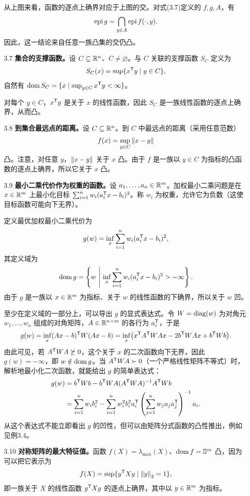 从上图来看，函数的逐点上确界对应于上图的交。对式(3.7)定义的 $f,g,A$，有
\[\operatorname{epi} g=\bigcap_{y\in A}\operatorname{epi} f(\cdot,y).\]
因此，这一结论来自任意一族凸集的交仍凸。
\begin{origexample}{3.7}
\textbf{集合的支撑函数。}设 $C\subseteq\mathbb R^n$、$C\ne\varnothing$。与 $C$ 关联的支撑函数 $S_C$ 定义为
\[S_C(x)=\sup\{x^\mathsf T y\mid y\in C\},\]
自然有 $\operatorname{dom} S_C=\{x\mid\sup_{y\in C}x^\mathsf T y<\infty\}$。

对每个 $y\in C$，$x^\mathsf T y$ 是关于 $x$ 的线性函数，因此 $S_C$ 是一族线性函数的逐点上确界，从而凸。
\end{origexample}
\begin{origexample}{3.8}
\textbf{到集合最远点的距离。}设 $C\subseteq\mathbb R^n$。到 $C$ 中最远点的距离（采用任意范数）
\[f(x)=\sup_{y\in C}\left\lVert x-y\right\rVert\]
凸。注意，对任意 $y$，$\left\lVert x-y\right\rVert$ 关于 $x$ 凸。由于 $f$ 是一族以 $y\in C$ 为指标的凸函数的逐点上确界，所以它关于 $x$ 凸。
\end{origexample}
\begin{origexample}{3.9}
\textbf{最小二乘代价作为权重的函数。}设 $a_1,\ldots,a_n\in\mathbb R^m$。加权最小二乘问题是在 $x\in\mathbb R^m$ 上最小化目标 $\sum_{i=1}^n w_i(a_i^\mathsf T x-b_i)^2$。称 $w_i$ 为权重，允许它为负数（这使目标函数可能向下无界）。

定义最优加权最小二乘代价为
\[g(w)=\inf_x\sum_{i=1}^n w_i(a_i^\mathsf T x-b_i)^2,\]
其定义域为
\[\operatorname{dom} g=\left\{w\ \middle|\ \inf_x\sum_{i=1}^n w_i(a_i^\mathsf T x-b_i)^2>-\infty\right\}.\]
由于 $g$ 是一族以 $x\in\mathbb R^m$ 为指标、关于 $w$ 的线性函数的下确界，所以关于 $w$ 凹。

至少在定义域的一部分上，可以导出 $g$ 的显式表达式。令 $W=\operatorname{diag}(w)$ 为对角元 $w_1,\ldots,w_n$ 组成的对角矩阵，$A\in\mathbb R^{n\times m}$ 的各行为 $a_i^\mathsf T$，于是
\[
 g(w)=\inf_x(Ax-b)^\mathsf T W(Ax-b)
 =\inf_x\bigl(x^\mathsf T A^\mathsf T WAx-2b^\mathsf T WAx+b^\mathsf T Wb\bigr).
\]
由此可见，若 $A^\mathsf T WA\not\succeq0$，这个关于 $x$ 的二次函数向下无界，因此 $g(w)=-\infty$，即 $w\notin\operatorname{dom} g$。当 $A^\mathsf T WA\succ0$（一个严格线性矩阵不等式）时，解析地最小化二次函数，就能给出 $g$ 的简单表达式：
\[
\begin{aligned}
 g(w)&=b^\mathsf T Wb-b^\mathsf T WA(A^\mathsf T WA)^{-1}A^\mathsf T Wb\\
 &=\sum_{i=1}^n w_i b_i^2-
 \sum_{i=1}^n w_i^2b_i^2a_i^\mathsf T
 \left(\sum_{j=1}^n w_ja_ja_j^\mathsf T\right)^{-1}a_i.
\end{aligned}
\]
从这个表达式不能立即看出 $g$ 的凹性，但可以由矩阵分式函数的凸性推出，例如见例3.4。
\end{origexample}
\begin{origexample}{3.10}
\textbf{对称矩阵的最大特征值。}函数 $f(X)=\lambda_{\max}(X)$、$\operatorname{dom} f=\mathbb S^m$ 凸，因为可以把它表示为
\[f(X)=\sup\{y^\mathsf T Xy\mid\left\lVert y\right\rVert_2=1\},\]
即一族关于 $X$ 的线性函数 $y^\mathsf T Xy$ 的逐点上确界，其中以 $y\in\mathbb R^m$ 为指标。
\end{origexample}
